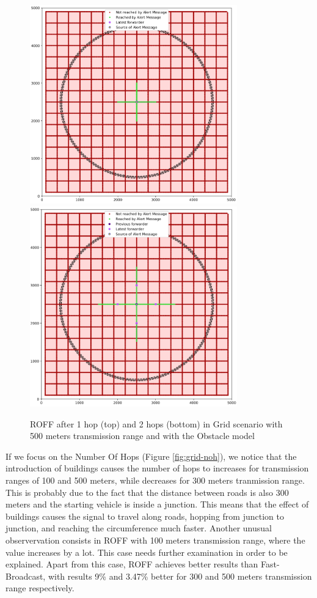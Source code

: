 		\begin{figure}[H]
			\centering
			\includegraphics[width=0.8\textwidth]{immagini/grid-300/b1/roff-1hop}
			\includegraphics[width=0.8\textwidth]{immagini/grid-300/b1/roff-2hop}
			\caption{ROFF after 1 hop (top) and 2 hops (bottom) in Grid scenario with 500 meters transmission range and with the Obstacle model}
			\label{fig:roff-b1-grid-transmission}
		\end{figure}
		
		If we focus on the Number Of Hops (Figure \ref{fig:grid-noh}), we notice that the introduction of buildings causes the number of hops to increases for transmission ranges of 100 and 500 meters, while decreases for 300 meters tranmission range. This is probably due to the fact that the distance between roads is also 300 meters and the starting vehicle is inside a junction. This means that the effect of buildings causes the signal to travel along roads, hopping from junction to junction, and reaching the circumference much faster. Another unusual observervation consists in ROFF with 100 meters transmission range, where the value increases by a lot. This case needs further examination in order to be explained. Apart from this case, ROFF achieves better results than Fast-Broadcast, with results 9\% and 3.47\% better for 300 and 500 meters transmission range respectively. 
		
